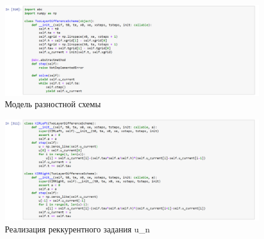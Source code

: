 \documentclass[a4paper,14pt]{article}
\begin{document}
    \begin{figure}[h]
		\begin{center}
			\includegraphics[scale=0.4]{1}
 			\caption{Модель разностной схемы}        
		\end{center}
	\end{figure}
\begin{figure}[h]
		\begin{center}
			\includegraphics[scale=0.4]{2}
 			\caption{Реализация реккурентного задания u\_n}        
		\end{center}
	\end{figure}

    \newpage
\end{document}
